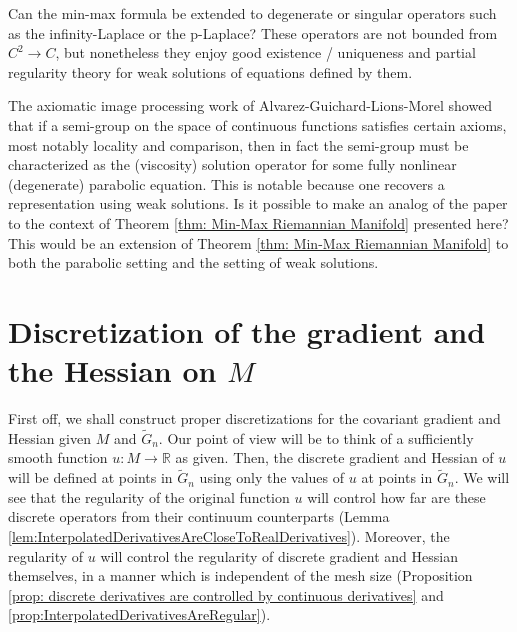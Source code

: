 \documentclass[11pt,reqno]{amsart}
\numberwithin{equation}{section}
\theoremstyle{plain}
\begin{document}
\begin{question}
	Can the min-max formula be extended to degenerate or singular operators such as the infinity-Laplace or the p-Laplace?  These operators are not bounded from $C^2\to C$, but nonetheless they enjoy good existence / uniqueness and partial regularity theory for weak solutions of equations defined by them.
\end{question}

\begin{question}
	The axiomatic image processing work of Alvarez-Guichard-Lions-Morel \cite{AlvarezLionsGuichardMorel-1993AxiomsImageProARMA} showed that if a semi-group on the space of continuous functions satisfies certain axioms, most notably locality and comparison, then in fact the semi-group must be characterized as the (viscosity) solution operator for some fully nonlinear (degenerate) parabolic equation.  This is notable because one recovers a representation using weak solutions. Is it possible to make an analog of the paper \cite{AlvarezLionsGuichardMorel-1993AxiomsImageProARMA} to the context of Theorem \ref{thm: Min-Max Riemannian Manifold} presented here?  This would be an extension of Theorem \ref{thm: Min-Max Riemannian Manifold} to both the parabolic setting and the setting of weak solutions.
\end{question}



\appendix


\section{Discretization of the gradient and the Hessian on $M$}

First off, we shall construct proper discretizations for the covariant gradient and Hessian given $M$ and $\tilde G_n$. Our point of view will be to think of a sufficiently smooth function $u:M\to\mathbb{R}$ as given. Then, the discrete gradient and Hessian of $u$ will be defined at points in $\tilde G_n$ using only the values of $u$ at points in $\tilde G_n$. We will see that the regularity of the original function $u$ will control how far are these discrete operators from their continuum counterparts (Lemma \ref{lem:InterpolatedDerivativesAreCloseToRealDerivatives}). Moreover, the regularity of $u$ will control the regularity of discrete gradient and Hessian themselves, in a manner which is independent of the mesh size (Proposition \ref{prop: discrete derivatives are controlled by continuous derivatives} and \ref{prop:InterpolatedDerivativesAreRegular}).
\end{document}
